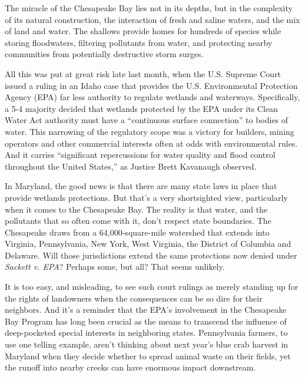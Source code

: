 \documentclass[12pt,a4paper]{article}
\begin{document}
\begin{reading}

\begin{examtext}
The miracle of the Chesapeake Bay lies not in its depths, but in the complexity of its natural construction, the interaction of fresh and saline waters, and the mix of land and water. The shallows provide homes for hundreds of species while storing floodwaters, filtering pollutants from water, and protecting nearby communities from potentially destructive storm surges.

All this was put at great risk late last month, when the U.S. Supreme Court issued a ruling in an Idaho case that provides the U.S. Environmental Protection Agency (EPA) far less authority to regulate wetlands and waterways. Specifically, a 5-4 majority decided that wetlands protected by the EPA under its Clean Water Act authority must have a ``continuous surface connection'' to bodies of water. This narrowing of the regulatory scope was a victory for builders, mining operators and other commercial interests often at odds with environmental rules. And it carries ``significant repercussions for water quality and flood control throughout the United States,'' as Justice Brett Kavanaugh observed.

In Maryland, the good news is that there are many state laws in place that provide wetlands protections. But that's a very shortsighted view, particularly when it comes to the Chesapeake Bay. The reality is that water, and the pollutants that so often come with it, don't respect state boundaries. The Chesapeake draws from a 64,000-square-mile watershed that extends into Virginia, Pennsylvania, New York, West Virginia, the District of Columbia and Delaware. Will those jurisdictions extend the same protections now denied under \textit{Sackett v. EPA}? Perhaps some, but all? That seems unlikely.

It is too easy, and misleading, to see such court rulings as merely standing up for the rights of landowners when the consequences can be so dire for their neighbors. And it's a reminder that the EPA's involvement in the Chesapeake Bay Program has long been crucial as the means to transcend the influence of deep-pocketed special interests in neighboring states. Pennsylvania farmers, to use one telling example, aren't thinking about next year's blue crab harvest in Maryland when they decide whether to spread animal waste on their fields, yet the runoff into nearby creeks can have enormous impact downstream.


\end{examtext}
\end{reading}
\end{document}
